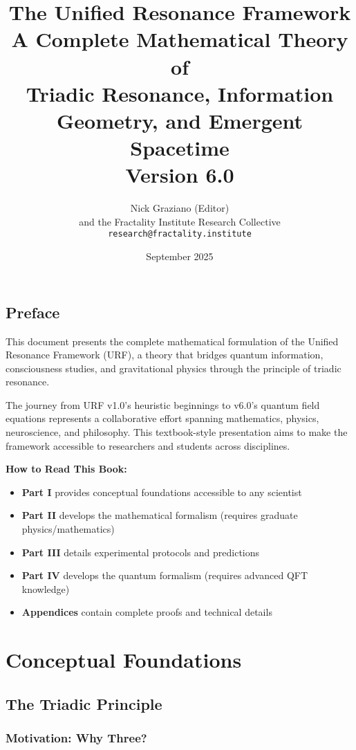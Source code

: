 \documentclass[openany]{memoir}
\title{\textbf{The Unified Resonance Framework}\\[0.5cm]
\Large A Complete Mathematical Theory of\\
Triadic Resonance, Information Geometry, and Emergent Spacetime\\[1cm]
\normalsize Version 6.0}
\author{Nick Graziano (Editor)\\
and the Fractality Institute Research Collective\\[0.5cm]
\texttt{research@fractality.institute}}
\date{September 2025}
\theoremstyle{definition}
\theoremstyle{plain}
\theoremstyle{remark}
\begin{document}
\frontmatter
\maketitle

\tableofcontents

\chapter*{Preface}

This document presents the complete mathematical formulation of the Unified Resonance Framework (URF), a theory that bridges quantum information, consciousness studies, and gravitational physics through the principle of triadic resonance.

The journey from URF v1.0's heuristic beginnings to v6.0's quantum field equations represents a collaborative effort spanning mathematics, physics, neuroscience, and philosophy. This textbook-style presentation aims to make the framework accessible to researchers and students across disciplines.

\textbf{How to Read This Book:}
\begin{itemize}
\item \textbf{Part I} provides conceptual foundations accessible to any scientist
\item \textbf{Part II} develops the mathematical formalism (requires graduate physics/mathematics)
\item \textbf{Part III} details experimental protocols and predictions
\item \textbf{Part IV} develops the quantum formalism (requires advanced QFT knowledge)
\item \textbf{Appendices} contain complete proofs and technical details
\end{itemize}

\mainmatter

\nopartblankpage
\part{Conceptual Foundations}

\chapter{The Triadic Principle}

\section{Motivation: Why Three?}
\end{document}
